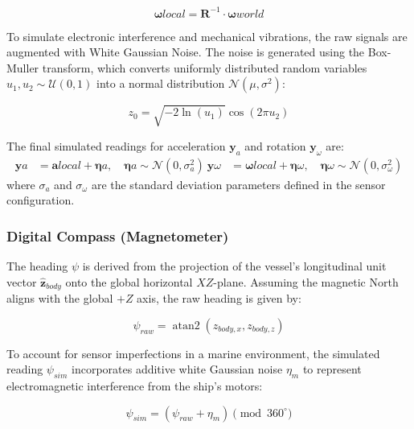\begin{equation}
    \mathbf{\omega}{local} = \mathbf{R}^{-1} \cdot \mathbf{\omega}{world}
\end{equation}

To simulate electronic interference and mechanical vibrations, the raw signals are augmented with White Gaussian Noise. The noise is generated using the Box-Muller transform, which converts uniformly distributed random variables $u_1, u_2 \sim \mathcal{U}(0,1)$ into a normal distribution $\mathcal{N}(\mu, \sigma^2)$:

\begin{equation}
    z_0 = \sqrt{-2\ln(u_1)} \cos(2\pi u_2)
\end{equation}

The final simulated readings for acceleration $\mathbf{y}_a$ and rotation $\mathbf{y}_\omega$ are:\begin{align}\mathbf{y}a &= \mathbf{a}{local} + \mathbf{\eta}a, \quad \mathbf{\eta}a \sim \mathcal{N}(0, \sigma_a^2) \
\mathbf{y}\omega &= \mathbf{\omega}{local} + \mathbf{\eta}\omega, \quad \mathbf{\eta}\omega \sim \mathcal{N}(0, \sigma_\omega^2)\end{align}where $\sigma_a$ and $\sigma_\omega$ are the standard deviation parameters defined in the sensor configuration.






\subsubsection{Digital Compass (Magnetometer)}
The heading $\psi$ is derived from the projection of the vessel's longitudinal unit vector $\mathbf{\hat{z}}_{body}$ onto the global horizontal $XZ$-plane. Assuming the magnetic North aligns with the global $+Z$ axis, the raw heading is given by:

\begin{equation}
    \psi_{raw} = \operatorname{atan2}(z_{body, x}, z_{body, z})
\end{equation}

To account for sensor imperfections in a marine environment, the simulated reading $\psi_{sim}$ incorporates additive white Gaussian noise $\eta_{m}$ to represent electromagnetic interference from the ship's motors:

\begin{equation}
    \psi_{sim} = (\psi_{raw} + \eta_{m}) \pmod{360^{\circ}}
\end{equation}